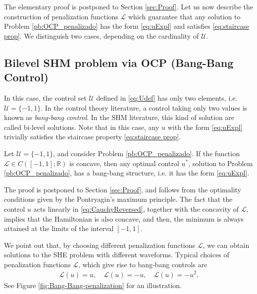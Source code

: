 \documentclass[twocolumn]{autart}    %
\begin{document}
The elementary proof is postponed to Section \ref{sec:Proof}. Let us now describe the construction of penalization functions $\mathcal{L}$ which guarantee that any solution to Problem \ref{pb:OCP_penalizado} has the form \eqref{eq:uExpl} and satisfies \eqref{eq:staircase prop}. We distinguish two cases, depending on the cardinality of $\mathcal{U}$.

\subsection{Bilevel SHM problem via OCP (Bang-Bang Control)} 

In this case, the control set $\mathcal{U}$ defined in \eqref{eq:Udef} has only two elements, i.e.  $\mathcal{U}=\{-1,1\}$.
In the control theory literature, a control taking only two values is known as \emph{bang-bang control}. In the SHM literature, this kind of solution are called bi-level solutions. Note that in this case, any $u$ with the form \eqref{eq:uExpl}  trivially satisfies the staircase property \eqref{eq:staircase prop}.

\bigskip

\begin{theorem}\label{th:bang-bang}
Let $\mathcal{U}=\{ -1, 1\}$, and consider Problem \ref{pb:OCP_penalizado}. If the function $\mathcal{L}\in C([-1,1];\mathbb{R})$ is concave, then any optimal control $u^\ast$, solution to Problem \ref{pb:OCP_penalizado}, has a bang-bang structure, i.e. it has the form \eqref{eq:uExpl}.
\end{theorem}

The proof is postponed to Section \ref{sec:Proof}, and follows from the optimality conditions given by the Pontryagin's maximum principle. The fact that the control $u$ acts linearly in \eqref{eq:CauchyReversed}, together with the concavity of $\mathcal{L}$, implies that the Hamiltonian is also concave, and then, the minimum is always attained at the limits of the interval $[-1,1]$.

We point out that, by choosing different penalization functions $\mathcal{L}$, we can obtain solutions to the SHE problem with different waveforms.
Typical choices of penalization functions $\mathcal{L}$, which give rise to bang-bang controls are 
\begin{align*}
	\mathcal{L}(u) = u,  \quad \mathcal{L}(u) = -u,  \quad \mathcal{L}(u) = -u^2.
\end{align*} 
See Figure \ref{fig:Bang-Bang-penalization} for an illustration.
\end{document}
